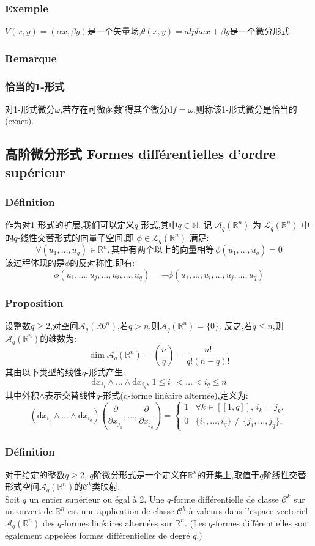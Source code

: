 \documentclass[12pt, a4paper, oneside]{ctexbook}
\newcommand{\di }{\text{d}}%
\newcommand{\pian }{\partial}%
\newcommand{\R }{\mathbb{R}}%
\newcommand{\N }{\mathbb{N}}%
\newcommand{\C }{\mathcal{C}}%
\begin{document}
  \subsubsection{Exemple}
  $V(x,y)=(\alpha x,\beta y)$是一个矢量场,$\theta(x,y)=alpha x+\beta y$是一个微分形式.
  \subsubsection{Remarque}
  \subsubsection{恰当的1-形式}
  对1-形式微分$\omega$,若存在可微函数\f 使得其全微分$\di f=\omega$,则称该1-形式微分是恰当的(exact).
  
  \subsection{高阶微分形式 Formes différentielles d'ordre supérieur}
  \subsubsection{Définition}
  作为对1-形式的扩展,我们可以定义$q$-形式,其中$q\in\N$.
  记 $\mathcal{A}_q(\R^n)$ 为 $\mathcal{L}_q (\R^n)$ 中的$q$-线性交替形式的向量子空间,即 $\phi \in\mathcal{L}_q (\R^n)$ 满足:
  $$
  \forall (u_1,\dots,u_q)\in\R^n,\text{其中有两个以上的向量相等}\,\phi(u_1,\dots,u_q)=0
  $$
  该过程体现的是$\phi$的反对称性,即有:
  $$
  \phi(u_1,\dots,u_j,\dots,u_i,\dots,u_q)=-\phi(u_1,\dots,u_i,\dots,u_j,\dots,u_q)
  $$
  \subsubsection{Proposition}
  设整数$q\geq 2$,对空间$\mathcal{A}_q(\R6^n)$,若$q>n$,则$\mathcal{A}_q(\R^n)=\{0\}$.
  反之,若$q\leq n$,则$\mathcal{A}_q(\R^n)$的维数为:
  $$
  \dim\mathcal{A}_q(\R^n)=\binom{n}{q}=\frac{n!}{q!(n-q)!}
  $$
  其由以下类型的线性$q$-形式产生:
  $$
  \di x_{i_1}\wedge\dots\wedge\di x_{i_q},\,1\leq i_1<\dots<i_q\leq n
  $$
  其中外积$\wedge$表示交替线性$q$-形式(q-forme linéaire alternée),定义为:
  $$
  (\di x_{i_1}\wedge\dots\wedge\di x_{i_q})(\frac{\pian }{\pian x_{j_1}},\dots,\frac{\pian }{\pian x_{j_q}})=
  \begin{cases}
    1&\forall k\in[\![1,q]\!],\,i_k=j_k,\\
    0&\{i_1,\dots,i_q\}\neq\{j_1,\dots,j_q\}.
  \end{cases}
  $$
  \subsubsection{Définition}
  对于给定的整数$q \geq 2$, $q$阶微分形式是一个定义在$\mathbb{R}^n$的开集上,取值于$q$阶线性交替形式空间$\mathcal{A}_q(\mathbb{R}^n)$的$\mathcal{C}^k$类映射.\\
  \indent
  Soit $q$ un entier supérieur ou égal à 2. 
  Une $q$-forme différentielle de classe $\C^k$ sur un ouvert de $\R^n$ est une application de classe $\C^k$ à valeurs dans l'espace vectoriel $\mathcal{A}_q(\R^n)$ des $q$-formes linéaires alternées sur $\R^n$. 
  (Les $q$-formes différentielles sont également appelées formes différentielles de degré $q$.)
\end{document}
